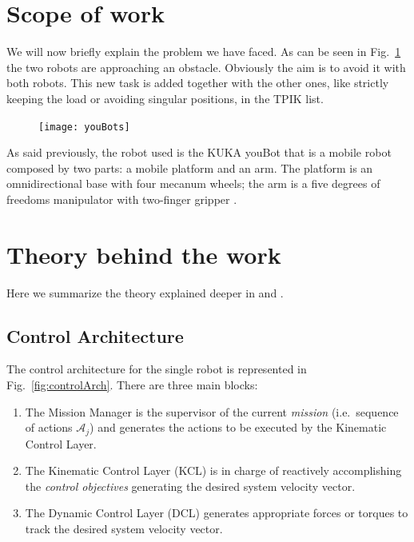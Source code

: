 \documentclass[a4paper, 12pt, notitlepage]{article}
\begin{document}
\begin{multicols}{2}
		\section{Scope of work}\label{sec:scope}
		\hspace{7px}We will now briefly explain the problem we have faced. As can be seen in Fig.\ \ref{fig:youBots} the two robots are approaching an obstacle. Obviously the aim is to avoid it with both robots.  
		This new task is added together with the other ones, like strictly keeping the load or avoiding singular positions, in the TPIK list.
		
		\begin{figure}[H]
			\centering
			\texttt{[image: youBots]}
			\label{fig:youBots}
		\end{figure}
		
		\hspace{-9px}As said previously, the robot used is the KUKA youBot that is a mobile robot composed by two parts: a mobile platform and an arm. The platform is an omnidirectional base with four mecanum wheels; the arm is a five degrees of freedoms manipulator with two-finger gripper \cite{kuka}.
		
		\section{Theory behind the work} \label{sec:theory}
		\hspace{7px} Here we summarize the theory explained deeper in \cite{coopcasa} and \cite{wander}.
		\subsection{Control Architecture}
		\hspace{7px} The control architecture for the single robot is represented in Fig.\ \ref{fig:controlArch}.
		There are three main blocks:
		\begin{enumerate}[leftmargin=*]
			\item The Mission Manager is the supervisor of the current \textit{mission} (i.e.\ sequence of actions $\mathcal{A}_j$) and generates the actions to be executed by the Kinematic Control Layer.
			\item The Kinematic Control Layer (KCL) is in charge of reactively accomplishing the \textit{control objectives} generating the desired system velocity vector.
			\item The Dynamic Control Layer (DCL) generates appropriate forces or torques to track the desired system velocity vector. 
		\end{enumerate}
		

\end{multicols}
\end{document}
